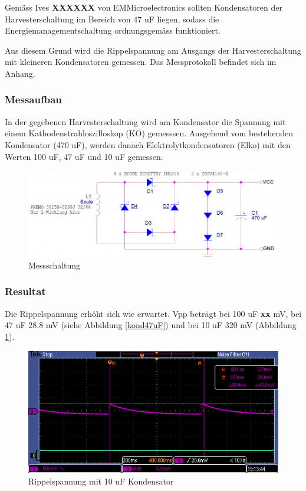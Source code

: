 Gemäss Ives \textbf{XXXXXX} von EMMicroelectronics sollten Kondensatoren der Harvesterschaltung im Bereich von 47 uF liegen, sodass die Energiemanagementschaltung ordnungsgemäss funktioniert.  

Aus diesem Grund wird die Rippelspannung am Ausgangs der Harvesterschaltung mit kleineren Kondensatoren gemessen. Das Messprotokoll befindet sich im Anhang.

\subsubsection*{Messaufbau}
In der gegebenen Harvesterschaltung wird am Kondensator die Spannung mit einem Kathodenstrahloszilloskop (KO) gemesssen. Ausgehend vom bestehenden Kondensator (470 uF), werden danach Elektrolytkondensatoren (Elko) mit den Werten 100 uF, 47 uF und 10 uF gemessen.

\begin{figure}
    \includegraphics[bb = 0 0 100 100]{3Vorgehen/imag/messschaltungHarvesterschaltung.jpg}
    \caption{Messschaltung}
\end{figure}

\subsubsection*{Resultat}

Die Rippelspannung erhöht sich wie erwartet. Vpp beträgt bei 100 uF \textbf{xx} mV, bei 47 uF 28.8 mV (siehe Abbildung \ref{kond47uF}) und bei 10 uF 320 mV (Abbildung \ref{kond10uF}).
 
\begin{figure}
    \includegraphics[bb = 0 0 100 100]{3Vorgehen/imag/10uF.PNG}
    \caption{Rippelspannung mit 10 uF Kondensator}\label{kond10uF} 
\end{figure}

